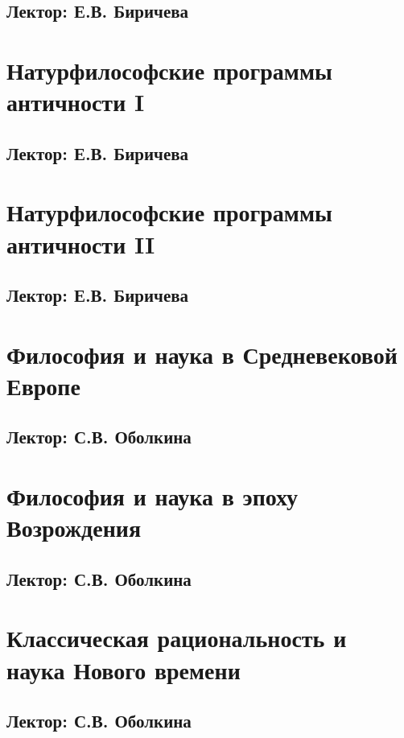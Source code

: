 \documentclass[a4paper, 12pt, notitlepage]{report}
\begin{document}
\section*{Лектор: Е.В. Биричева} 


\chapter{Натурфилософские программы античности I}
\section*{Лектор: Е.В. Биричева} 



\chapter{Натурфилософские программы античности II}
\section*{Лектор: Е.В. Биричева} 



\chapter{Философия и наука в Средневековой Европе}
\section*{Лектор: С.В. Оболкина} 



\chapter{Философия и наука в эпоху Возрождения}
\section*{Лектор: С.В. Оболкина} 



\chapter{Классическая рациональность и наука Нового времени}
\section*{Лектор: С.В. Оболкина} 


\end{document}
